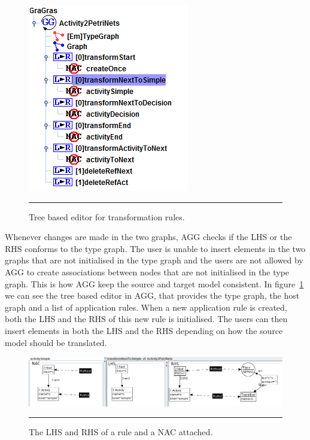 \begin{figure}[H]
	\centering
	\includegraphics[scale=0.7]{figures/AGGTreeBasedEditor.png}
	\rule{35em}{0.5pt}
	\caption[Tree based editor in AGG]
	{Tree based editor for transformation rules.}
	\label{fig:AGGTreeBasedEditor}
\end{figure}

Whenever changes are made in the two graphs, AGG checks if the LHS or the RHS
conforms to the type graph. The user is unable to insert elements in the two
graphs that are not initialised in the type graph and the users are not allowed
by AGG to create associations between nodes that are not initialised in the type
graph. This is how AGG keep the source and target model consistent. In
figure~\ref{fig:AGGTreeBasedEditor} we can see the tree based editor in AGG,
that provides the type graph, the host graph and a list of application rules.
When a new application rule is created, both the LHS and the RHS of this new
rule is initialised. The users can then insert elements in both the LHS and the
RHS depending on how the source model should be translated. 

\begin{figure}[H]
	\centering
	\includegraphics[scale=0.5]{figures/LHSvsRHSAGG.png}
	\rule{35em}{0.5pt}
	\caption[Representation of a rule in AGG]
	{The LHS and RHS of a rule and a NAC attached.}
	\label{fig:LHSvsRHSAGG}
\end{figure}

